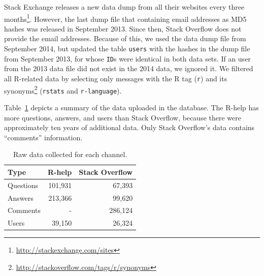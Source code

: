 Stack Exchange releases a new data dump from all their websites every three months\footnote{\url{http://stackexchange.com/sites}}.
However, the last dump file that containing email addresses as MD5 hashes was released in September 2013.
Since then, Stack Overflow does not provide the email addresses.
Because of this, we used the data dump file from September 2014, but updated the table \texttt{users} with the hashes in the dump file from September 2013, for whose \texttt{ID}s were identical in both data sets.
If an user from the 2013 data file did not exist in the 2014 data, we ignored it.
We filtered all R-related data by selecting only messages with the R tag (\texttt{r}) and its synonyms\footnote{\url{http://stackoverflow.com/tags/r/synonyms}} (\texttt{rstats} and \texttt{r-language}).

	Table~\ref{table:data} depicts a summary of the data uploaded in the database.
	The R-help has more questions, answers, and users than Stack Overflow, because there were approximately ten years of additional data.
	Only Stack Overflow's data contains ``comments'' information. %

	\begin{table}[!htb]
	  \centering
      \caption{Raw data collected for each channel.}
      \begin{small}
        \begin{tabular}{lrr}
	        \toprule
	        Type          &  R-help & Stack Overflow \\
	        \midrule
	        Questions     & 101,931 &  67,393 \\
	        Answers       & 213,366 &  99,620 \\
	        Comments      &       - & 286,124 \\
	        Users         &  39,150 &  26,324 \\
	        \bottomrule
        \end{tabular}
      \end{small}
	  \label{table:data}
	\end{table}


